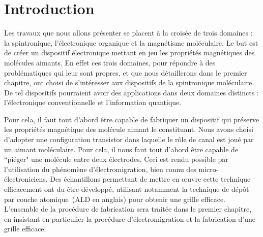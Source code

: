 \chapter*{Introduction}
\setcounter{figure}{0}

Les travaux que nous allons présenter se placent à la croisée de trois domaines : la spintronique, l'électronique organique et la magnétisme moléculaire. Le but est de créer un dispositif électronique mettant en jeu les propriétés magnétiques des molécules aimants. En effet ces trois domaines, pour répondre à des problématiques qui leur sont propres, et que nous détaillerons dans le premier chapitre, ont choisi de s'intéresser aux dispositifs de la spintronique moléculaire.  De tel dispositifs pourraient avoir des applications dans deux domaines distincts : l'électronique conventionnelle et l'information quantique.

Pour cela, il faut tout d'abord \^etre capable de fabriquer un dispositif qui préserve les propriétés magnétique des molécule aimant le constituant. Nous avons choisi d'adopter une configuration transistor dans laquelle le r\^ole de canal est joué par un aimant moléculaire. Pour cela, il nous faut tout d'abord être capable de ``piéger" une molécule entre deux électrodes. Ceci est rendu possible par l'utilisation du phénomène d’électromigration, bien connu des micro-électroniciens. Des échantillons permettant de mettre en œuvre cette technique efficacement ont du être développé, utilisant notamment la technique de dépôt par couche atomique~(ALD en anglais) pour obtenir une grille efficace. L'ensemble de la procédure de fabrication sera traitée dans le premier chapitre, en insistant en particulier la procédure d'électromigration et la fabrication d'une grille efficace.

